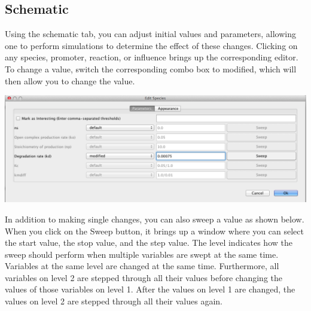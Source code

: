 \documentclass[titlepage,11pt]{article}
\begin{document}

\subsection{\label{AnalysisSchematic}Schematic}

\noindent
Using the schematic tab, you can adjust initial values and parameters, allowing one to perform simulations to determine the effect of these changes.  Clicking on any species, promoter, reaction, or influence brings up the corresponding editor.  To change a value, switch the corresponding combo box to modified, which will then allow you to change the value.  

\begin{center}
\includegraphics[width=160mm]{screenshots/paramEdit}
\end{center}

In addition to making single changes, you can also sweep a value as shown below.  When you click on the Sweep button, it brings up a window where you can select the start value, the stop value, and the step value.  The level indicates how the sweep should perform when multiple variables are swept at the same time.  Variables at the same level are changed at the same time.  Furthermore, all variables on level 2 are stepped through all their values before changing the values of those variables on level 1.  After the values on level 1 are changed, the values on level 2 are stepped through all their values again.  
\end{document}
